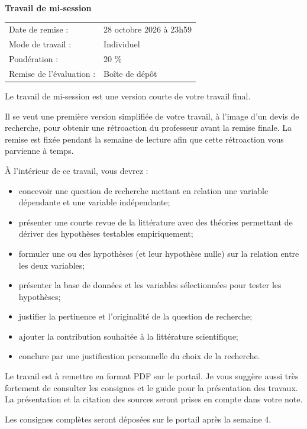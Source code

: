 \documentclass[10pt]{article}
\newcommand{\ulsubsub}[1]{%
  \needspace{3\baselineskip}%
  \vspace{8pt}%
  {\headfont\fontsize{11}{13}\selectfont\bfseries #1}\par
  \vspace{1pt}%
}
\begin{document}
\ulsubsub{Travail de mi-session}
{\fontsize{9.5}{12.5}\selectfont
\begin{tabular}{@{}L{1.9in}L{5.4in}@{}}
Date de remise : & 28 octobre 2026 à 23h59\\
Mode de travail : & Individuel\\
Pondération : & 20 \%\\
Remise de l'évaluation : & Boîte de dépôt\\
\end{tabular}\par
\vspace{4pt}
Le travail de mi-session est une version courte de votre travail final.\par
\vspace{4pt}
Il se veut une première version simplifiée de votre travail, à l'image d'un devis de recherche, pour obtenir une rétroaction du professeur avant la remise finale. La remise est fixée pendant la semaine de lecture afin que cette rétroaction vous parvienne à temps.\par
\vspace{4pt}
À l'intérieur de ce travail, vous devrez :
\begin{itemize}
  \item concevoir une question de recherche mettant en relation une variable dépendante et une variable indépendante;
  \item présenter une courte revue de la littérature avec des théories permettant de dériver des hypothèses testables empiriquement;
  \item formuler une ou des hypothèses (et leur hypothèse nulle) sur la relation entre les deux variables;
  \item présenter la base de données et les variables sélectionnées pour tester les hypothèses;
  \item justifier la pertinence et l'originalité de la question de recherche;
  \item ajouter la contribution souhaitée à la littérature scientifique;
  \item conclure par une justification personnelle du choix de la recherche.
\end{itemize}
Le travail est à remettre en format PDF sur le portail. Je vous suggère aussi très fortement de consulter les consignes et le guide pour la présentation des travaux. La présentation et la citation des sources seront prises en compte dans votre note.\par
\vspace{4pt}
Les consignes complètes seront déposées sur le portail après la semaine 4.\par}
\end{document}

